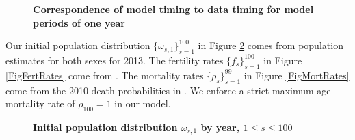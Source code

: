 \documentclass[12pt]{report}
\theoremstyle{definition}
\begin{document}
  \begin{figure}[htbp]\centering \captionsetup{width=4.0in}
    \caption{\label{FigPerTime}\textbf{Correspondence of model timing to data timing for model periods of one year}}
  \end{figure}

  Our initial population distribution $\{\omega_{s,1}\}_{s=1}^{100}$ in Figure \ref{FigInitPopDist} comes from \citet{Census:2014} population estimates for both sexes for 2013. The fertility rates $\{f_s\}_{s=1}^{100}$ in Figure \ref{FigFertRates} come from \citet[Table 1]{NVSR:2010}. The mortality rates $\{\rho_s\}_{s=1}^{99}$ in Figure \ref{FigMortRates} come from the 2010 death probabilities in \citet{SocSec:2010}. We enforce a strict maximum age mortality rate of $\rho_{100}=1$ in our model.

  \begin{figure}[htbp]\centering \captionsetup{width=4.0in}
    \caption{\label{FigInitPopDist}\textbf{Initial population distribution $\omega_{s,1}$ by year, $1\leq s\leq 100$}}
  \end{figure}
\end{document}
